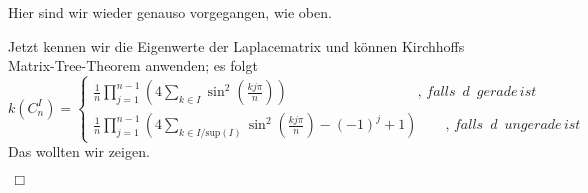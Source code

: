 \normalsize
Hier sind wir wieder genauso vorgegangen, wie oben.\\
\par
\endgroup
Jetzt kennen wir die Eigenwerte der Laplacematrix und können Kirchhoffs Matrix-Tree-Theorem anwenden; es folgt
\begin{equation}
\mathit{k}\left( C_n^I \right) = 
 \begin{cases}
\frac{1}{n} \prod_{j=1}^{n-1} \left(4 \sum_{k \in I} \sin^2 \left( \frac{kj\pi}{n}\right) \right)\qquad\qquad\qquad\qquad\quad\; ,\,falls\,\,\,d\,\,\,gerade\,ist\\
\frac{1}{n} \prod_{j=1}^{n-1} \left(4 \sum_{k \in I/\mathrm{sup}(I)} \sin^2 \left( \frac{kj\pi}{n}\right)-(-1)^j+1\right)\qquad,\,falls\,\,\,d\,\,\,ungerade\,ist
\end{cases}
\end{equation}
Das wollten wir zeigen.
\begin{flushright} $\,\Box\,$ \end{flushright} 
\begin{Bsps}
 

\end{Bsps} 
